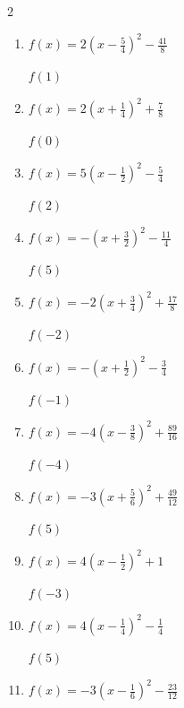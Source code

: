 \begin{multicols}{2}
\begin{enumerate}
  \item $\displaystyle f(x)=2\left( x-\frac{5}{4}\right)^{2}-\frac{41}{8}$

$f(1)$
        \phantom{$=-5$}

  \item $\displaystyle f(x)=2\left( x+\frac{1}{4}\right)^{2}+\frac{7}{8}$

$f(0)$
        \phantom{$=1$}

  \item $\displaystyle f(x)=5\left( x-\frac{1}{2}\right)^{2}-\frac{5}{4}$

$f(2)$
        \phantom{$=10$}

  \item $\displaystyle f(x)=-\left( x+\frac{3}{2}\right)^{2}-\frac{11}{4}$

$f(5)$
        \phantom{$=-45$}

\columnbreak %

  \item $\displaystyle f(x)=-2\left( x+\frac{3}{4}\right)^{2}+\frac{17}{8}$

$f(-2)$
        \phantom{$=-1$}

  \item $\displaystyle f(x)=-\left( x+\frac{1}{2}\right)^{2}-\frac{3}{4}$

$f(-1)$
        \phantom{$=-1$}

  \item $\displaystyle f(x)=-4\left( x-\frac{3}{8}\right)^{2}+\frac{89}{16}$

$f(-4)$
        \phantom{$=-71$}

  \item $\displaystyle f(x)=-3\left( x+\frac{5}{6}\right)^{2}+\frac{49}{12}$

$f(5)$
        \phantom{$=-98$}

  \item $\displaystyle f(x)=4\left( x-\frac{1}{2}\right)^{2}+1$

$f(-3)$
        \phantom{$=50$}

\columnbreak %

\resetques

  \item $\displaystyle f(x)=4\left( x-\frac{1}{4}\right)^{2}-\frac{1}{4}$

$f(5)$
        \phantom{$=90$}

  \item $\displaystyle f(x)=-3\left( x-\frac{1}{6}\right)^{2}-\frac{23}{12}$


\end{enumerate}
\end{multicols}
